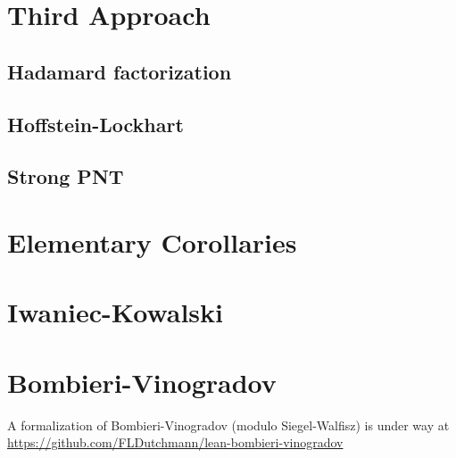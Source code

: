 \chapter{Third Approach}\label{third-approach-chapter}

\section{Hadamard factorization}

\section{Hoffstein-Lockhart}

\section{Strong PNT}

\chapter{Elementary Corollaries}\label{corollaries-chapter}


\chapter{Iwaniec-Kowalski}\label{IK-chapter}


\chapter{Bombieri-Vinogradov}\label{BV-chapter}

A formalization of Bombieri-Vinogradov (modulo Siegel-Walfisz) is under way at \url{https://github.com/FLDutchmann/lean-bombieri-vinogradov}




